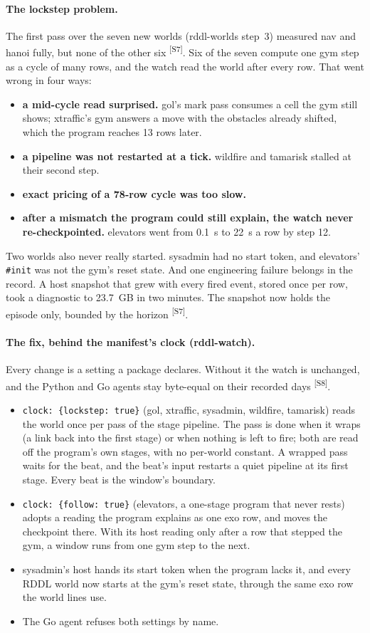 \documentclass[11pt]{article}
\newcommand{\src}[1]{\textsuperscript{[#1]}}
\begin{document}
\paragraph{The lockstep problem.} The first pass over the seven new
worlds (rddl-worlds step~3) measured nav and hanoi fully, but none of the
other six \src{S7}. Six of the seven compute one gym step as a cycle of
many rows, and the watch read the world after every row. That went wrong
in four ways:
\begin{itemize}[nosep]
\item \textbf{a mid-cycle read surprised.} gol's mark pass consumes a cell
  the gym still shows; xtraffic's gym answers a move with the obstacles
  already shifted, which the program reaches 13 rows later.
\item \textbf{a pipeline was not restarted at a tick.} wildfire and
  tamarisk stalled at their second step.
\item \textbf{exact pricing of a 78-row cycle was too slow.}
\item \textbf{after a mismatch the program could still explain, the watch
  never re-checkpointed.} elevators went from 0.1~s to 22~s a row by
  step 12.
\end{itemize}
Two worlds also never really started. sysadmin had no start token, and
elevators' \texttt{\#init} was not the gym's reset state. And one
engineering failure belongs in the record. A host snapshot that grew with
every fired event, stored once per row, took a diagnostic to 23.7~GB in two
minutes. The snapshot now holds the episode only, bounded by the horizon
\src{S7}.

\paragraph{The fix, behind the manifest's clock (rddl-watch).} Every
change is a setting a package declares. Without it the watch is unchanged,
and the Python and Go agents stay byte-equal on their recorded days
\src{S8}.
\begin{itemize}[nosep]
\item \texttt{clock: \{lockstep: true\}} (gol, xtraffic, sysadmin,
  wildfire, tamarisk) reads the world once per pass of the stage
  pipeline. The pass is done when it wraps (a link back into the first
  stage) or when nothing is left to fire; both are read off the program's
  own stages, with no per-world constant. A wrapped pass waits for the
  beat, and the beat's input restarts a quiet pipeline at its first
  stage. Every beat is the window's boundary.
\item \texttt{clock: \{follow: true\}} (elevators, a one-stage program
  that never rests) adopts a reading the program explains as one exo row,
  and moves the checkpoint there. With its host reading only after a row
  that stepped the gym, a window runs from one gym step to the next.
\item sysadmin's host hands its start token when the program lacks it,
  and every RDDL world now starts at the gym's reset state, through the
  same exo row the world lines use.
\item The Go agent refuses both settings by name.
\end{itemize}
\end{document}

